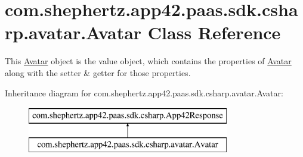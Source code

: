 \hypertarget{classcom_1_1shephertz_1_1app42_1_1paas_1_1sdk_1_1csharp_1_1avatar_1_1_avatar}{\section{com.\+shephertz.\+app42.\+paas.\+sdk.\+csharp.\+avatar.\+Avatar Class Reference}
\label{classcom_1_1shephertz_1_1app42_1_1paas_1_1sdk_1_1csharp_1_1avatar_1_1_avatar}
}


This \hyperlink{classcom_1_1shephertz_1_1app42_1_1paas_1_1sdk_1_1csharp_1_1avatar_1_1_avatar}{Avatar} object is the value object, which contains the properties of \hyperlink{classcom_1_1shephertz_1_1app42_1_1paas_1_1sdk_1_1csharp_1_1avatar_1_1_avatar}{Avatar} along with the setter \& getter for those properties.  


Inheritance diagram for com.\+shephertz.\+app42.\+paas.\+sdk.\+csharp.\+avatar.\+Avatar\+:\begin{figure}[H]
\begin{center}
\leavevmode
\includegraphics[height=2.000000cm]{classcom_1_1shephertz_1_1app42_1_1paas_1_1sdk_1_1csharp_1_1avatar_1_1_avatar}
\end{center}
\end{figure}
